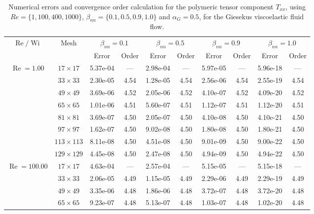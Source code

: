 \documentclass[preprint, 12pt]{elsarticle}
\begin{document}
{\begin{center}
\begin{table}[H]
\caption{Numerical errors and convergence order calculation for the polymeric tensor component $T_{xx}$, using $Re=\{1,100,400,1000\}$, $\beta_{nn}=\{0.1,0.5,0.9,1.0\}$ and \mbox{$\alpha_G = 0.5$}, for the Giesekus viscoelastic fluid flow.\label{tab_GiesekusTxxalphaG05Wi5_10}}
\tiny{
    \begin{tabular*}{\textwidth}{@{\extracolsep\fill}cccccccccc@{}}
    \hline
    \multirow{2}{*}{$\operatorname{Re}/\operatorname{Wi}$} & \multirow{2}{*}{Mesh} & \multicolumn{2}{c}{$\beta_{nn}=0.1$}  & \multicolumn{2}{c}{$\beta_{nn}=0.5$}  & \multicolumn{2}{c}{$\beta_{nn}=0.9$}  & \multicolumn{2}{c}{$\beta_{nn}=1.0$}\\ %
     & & Error & Order & Error & Order & Error & Order & Error & Order \\
    \hline
    \multirow{7}{*}{$\operatorname{Re}=1.00$} & $17\times 17$ & 5.37e-04 & --- & 2.98e-04 & --- & 5.97e-05 & --- & 5.96e-18 & --- \\
    & $33\times 33$ & 2.30e-05 & 4.54 & 1.28e-05 & 4.54 & 2.56e-06 & 4.54 & 2.55e-19 & 4.54 \\
    & $49\times 49$ & 3.69e-06 & 4.52 & 2.05e-06 & 4.52 & 4.10e-07 & 4.52 & 4.09e-20 & 4.52 \\
    \multirow{3}{*}{$\operatorname{Wi}=5$} & $65\times 65$ & 1.01e-06 & 4.51 & 5.60e-07 & 4.51 & 1.12e-07 & 4.51 & 1.12e-20 & 4.51 \\
    & $81\times 81$ & 3.69e-07 & 4.50 & 2.05e-07 & 4.50 & 4.10e-08 & 4.50 & 4.10e-21 & 4.50 \\
    & $97\times 97$ & 1.62e-07 & 4.50 & 9.02e-08 & 4.50 & 1.80e-08 & 4.50 & 1.80e-21 & 4.50 \\
    & $113\times 113$ & 8.11e-08 & 4.50 & 4.51e-08 & 4.50 & 9.01e-09 & 4.50 & 9.00e-22 & 4.50 \\
    & $129\times 129$ & 4.45e-08 & 4.50 & 2.47e-08 & 4.50 & 4.94e-09 & 4.50 & 4.94e-22 & 4.50 \\
    \hline
    \multirow{7}{*}{$\operatorname{Re}=100.00$} & $17\times 17$ & 4.63e-04 & --- & 2.57e-04 & --- & 5.15e-05 & --- & 5.15e-18 & --- \\
    & $33\times 33$ & 2.06e-05 & 4.49 & 1.15e-05 & 4.49 & 2.29e-06 & 4.49 & 2.29e-19 & 4.49 \\
    & $49\times 49$ & 3.35e-06 & 4.48 & 1.86e-06 & 4.48 & 3.72e-07 & 4.48 & 3.72e-20 & 4.48 \\
    \multirow{3}{*}{$\operatorname{Wi}=5$} & $65\times 65$ & 9.23e-07 & 4.48 & 5.13e-07 & 4.48 & 1.03e-07 & 4.48 & 1.02e-20 & 4.48 \\

\end{tabular*}}
\end{table}
\end{center}}
\end{document}
